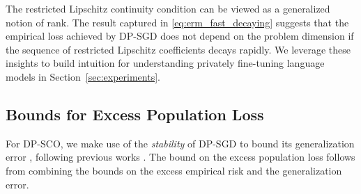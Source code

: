

The restricted Lipschitz continuity condition can be viewed as a generalized notion of rank.
The result captured in \eqref{eq:erm_fast_decaying} suggests that the empirical loss achieved by DP-SGD does not depend on the problem dimension if the sequence of restricted Lipschitz coefficients decays rapidly. 
We leverage these insights to build intuition for understanding privately fine-tuning language models in Section~\ref{sec:experiments}.


\subsection{Bounds for Excess Population Loss}
For DP-SCO, we make use of the \emph{stability} of DP-SGD to bound its generalization error \cite{BE02}, following previous works \cite{bassily2019private,BFGT20,song2021evading}.
The bound on the excess population loss follows from combining the bounds on the excess empirical risk and the generalization error.

